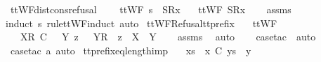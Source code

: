 \begin{isabellebody}
\endisatagproof
{\isafoldproof}%
%
\isadelimproof
\isanewline
%
\endisadelimproof
\isanewline
{}\isamarkupfalse%
\ ttWF{\isacharunderscore}dist{\isacharunderscore}cons{\isacharunderscore}refusal{\isacharcolon}\ \isanewline
\ \ \ {\isachardoublequoteopen}ttWF\ {\isacharparenleft}s\ {\isacharat}\ {\isacharbrackleft}{\isacharbrackleft}S{\isacharbrackright}\isactrlsub R{\isacharcomma}x{\isacharbrackright}{\isacharparenright}{\isachardoublequoteclose}\isanewline
\ \ \ {\isachardoublequoteopen}ttWF\ {\isacharbrackleft}{\isacharbrackleft}S{\isacharbrackright}\isactrlsub R{\isacharcomma}x{\isacharbrackright}{\isachardoublequoteclose}\isanewline
%
\isadelimproof
\ \ %
\endisadelimproof
%
\isatagproof
{}\isamarkupfalse%
\ assms\ \isamarkupfalse%
{\isacharparenleft}induct\ s\ rule{\isacharcolon}ttWF{\isachardot}induct{\isacharcomma}\ auto{\isacharparenright}%
\endisatagproof
{\isafoldproof}%
%
\isadelimproof
\isanewline
%
\endisadelimproof
\isanewline
{}\isamarkupfalse%
\ ttWF{\isacharunderscore}Refusal{\isacharunderscore}tt{\isacharunderscore}prefix{\isacharcolon}\isanewline
\ \ \ {\isachardoublequoteopen}ttWF\ {\isasymsigma}{\isachardoublequoteclose}\isanewline
\ \ \ {\isachardoublequoteopen}{\isacharbrackleft}{\isacharbrackleft}X{\isacharbrackright}\isactrlsub R{\isacharbrackright}\ {\isasymlesssim}\isactrlsub C\ {\isasymsigma}\ {\isacharequal}\ {\isacharparenleft}{\isasymexists}Y\ z{\isachardot}\ {\isasymsigma}\ {\isacharequal}\ {\isacharparenleft}{\isacharbrackleft}{\isacharbrackleft}Y{\isacharbrackright}\isactrlsub R{\isacharbrackright}\ {\isacharat}\ z{\isacharparenright}\ {\isasymand}\ X\ {\isasymsubseteq}\ Y{\isacharparenright}{\isachardoublequoteclose}\isanewline
%
\isadelimproof
\ \ %
\endisadelimproof
%
\isatagproof
{}\isamarkupfalse%
\ assms\ \isamarkupfalse%
\ auto\isanewline
\ \ \isamarkupfalse%
\ {\isacharparenleft}case{\isacharunderscore}tac\ {\isasymsigma}{\isacharcomma}\ auto{\isacharparenright}\isanewline
\ \ \isamarkupfalse%
\ {\isacharparenleft}case{\isacharunderscore}tac\ a{\isacharcomma}\ auto{\isacharparenright}%
\endisatagproof
{\isafoldproof}%
%
\isadelimproof
\isanewline
%
\endisadelimproof
\isanewline
{}\isamarkupfalse%
\ tt{\isacharunderscore}prefix{\isacharunderscore}eq{\isacharunderscore}length{\isacharunderscore}imp{\isacharcolon}\isanewline
\ \ \ {\isachardoublequoteopen}xs\ {\isacharat}\ {\isacharbrackleft}x{\isacharbrackright}\ {\isasymlesssim}\isactrlsub C\ ys\ {\isacharat}\ {\isacharbrackleft}y{\isacharbrackright}{\isachardoublequoteclose}\isanewline

\end{isabellebody}
